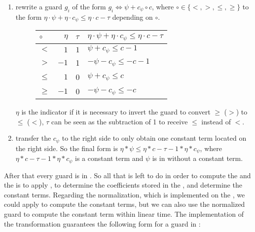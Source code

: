 \begin{enumerate}
		\begin{enumerate}
			\item rewrite a guard $g_i$ of the form $g_i \Leftrightarrow \psi + c_{\psi} \circ c$, where $\circ \in \{<,>,\le,\ge\}$ to the form $ \eta\cdot\psi + \eta\cdot c_{\psi} \le \eta\cdot c-\tau$ depending on $\circ$.\newline
			\begin{figure}[H]
				\centering
				\begin{tabular}{|l|r|l|l|}
					\hline
					$\circ$ 	& $\eta$ 	& $\tau$ 	&  $ \eta\cdot \psi + \eta\cdot c_{\psi} \le \eta\cdot c-\tau$ \\ 
					\hline \hline
					$<$ 		& $1$ 		&  $1$ 		& $\psi + c_{\psi} \le c - 1$ \\ \hline
					$>$ 		& $-1$		&  1 		& $-\psi - c_{\psi} \le -c -1 $ \\ \hline
					$\le$ 		& $1$ 		&  0 		& $\psi + c_{\psi} \le c$ \\ \hline
					$\ge$ 		& $-1$ 		&  0 		& $-\psi - c_{\psi} \le -c$ \\ \hline
				\end{tabular}
			\end{figure}
			$\eta$ is the indicator if it is necessary to invert the guard to convert $\ge$ ($>$) to $\le$ ($<$),\newline
			$\tau$ can be seen as the subtraction of 1 to receive $\le$ instead of $<$.
			\item transfer the $c_{\psi}$ to the right side to only obtain one constant term located on the right side. So the final form is $\eta*\psi \le \eta*c -\tau -1*\eta*c_{\psi}$, where $\eta*c -\tau -1*\eta*c_{\psi}$ is a constant term and $\psi$ is in \stdLinInt without a constant term.
		\end{enumerate}
\end{enumerate}
 After that every guard is in \strG. So all that is left to do in order to compute the \guardmatrix and the \guardconstants is to apply , to determine the coefficients stored in the \guardmatrix, and determine the constant terms. \newline
 Regarding the normalization, which is implemented on the \rpntree, we could apply  to compute the constant terms, but we can also use the normalized guard to compute the constant term within linear time. The implementation of the transformation guarantees the following form for a guard in \strG:
 
